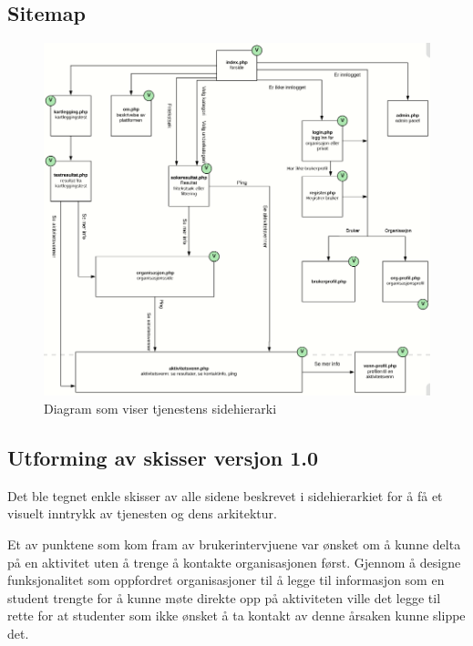 \subsection{Sitemap}

\begin{figure}[H]
\includegraphics[width=\textwidth]{Illustrasjoner/trehierarki.png}
\caption{Diagram som viser tjenestens sidehierarki}
\label{fig:trehierarki}
\end{figure}



\subsection{Utforming av skisser versjon 1.0}
\label{section:utforming-1}

Det ble tegnet enkle skisser av alle sidene beskrevet i sidehierarkiet for å få et visuelt inntrykk av tjenesten og dens arkitektur.

Et av punktene som kom fram av brukerintervjuene var ønsket om å kunne delta på en aktivitet uten å trenge å kontakte organisasjonen først. Gjennom å designe funksjonalitet som oppfordret organisasjoner til å legge til informasjon som en student trengte for å kunne møte direkte opp på aktiviteten ville det legge til rette for at studenter som ikke ønsket å ta kontakt av denne årsaken kunne slippe det.

